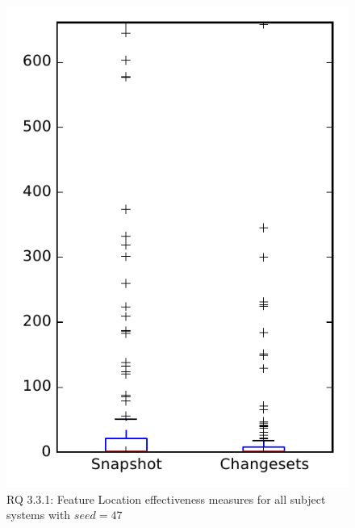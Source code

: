 
\begin{figure}
\centering
\includegraphics[height=0.4\textheight]{figures/flt_seed/rq1_overview_47}
\caption{RQ 3.3.1: Feature Location effectiveness measures for all subject systems with $seed=47$}
\label{fig:flt_seed:rq1:overview}
\end{figure}

